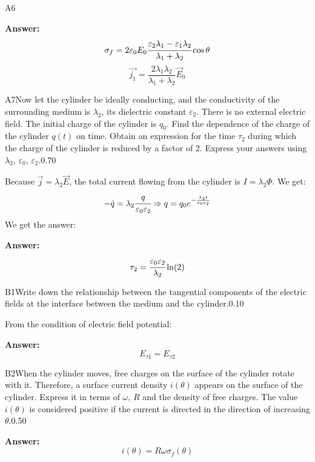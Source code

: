 \documentclass[11pt,a4paper]{article}
\begin{document}
\begin{solcard}{A6}
\par\smallskip\noindent\textbf{Answer:} \[\sigma_f = 2\varepsilon_0E_0\cfrac{\varepsilon_2\lambda_1 - \varepsilon_1\lambda_2}{\lambda_1 + \lambda_2}\cos\theta\]\[\vec{j_1} = \frac{2\lambda_1\lambda_2}{\lambda_1 + \lambda_2} \vec{E}_0\]
\end{solcard}

\begin{solcard}{A7}{Now let the cylinder be ideally conducting, and the conductivity of the surrounding medium is $\lambda_2$, its dielectric constant $\varepsilon_2$. There is no external electric field. The initial charge of the cylinder is $q_0$. Find the dependence of the charge of the cylinder $q(t)$ on time. Obtain an expression for the time $\tau_2$ during which the charge of the cylinder is reduced by a factor of 2. Express your answers using $\lambda_2$, $\varepsilon_0$, $\varepsilon_2$.}{0.70}

Because $\vec{j} = \lambda_2\vec{E}$, the total current flowing from the cylinder is $I = \lambda_2\Phi$. We get: \[-\dot{q} = \lambda_2\cfrac{q}{\varepsilon_0\varepsilon_2} \Rightarrow q = q_0e^{-\frac{\lambda_2t}{\varepsilon_0\varepsilon_2}}\]We get the answer:

\par\smallskip\noindent\textbf{Answer:} $$\tau_2 = \cfrac{\varepsilon_0\varepsilon_2}{\lambda_2}\ln(2)$$
\end{solcard}

\begin{solcard}{B1}{Write down the relationship between the tangential components of the electric fields at the interface between the medium and the cylinder.}{0.10}

From the condition of electric field potential:

\par\smallskip\noindent\textbf{Answer:} \[E_{\tau1} = E_{\tau2}\]
\end{solcard}

\begin{solcard}{B2}{When the cylinder moves, free charges on the surface of the cylinder rotate with it. Therefore, a surface current density $i (\theta)$ appears on the surface of the cylinder. Express it in terms of $\omega$, $R$ and the density of free charges.  The value $i(\theta)$ is considered positive if the current is directed in the direction of increasing $\theta$.}{0.50}
\par\smallskip\noindent\textbf{Answer:} \[i(\theta) = R\omega\sigma_f(\theta)\]
\end{solcard}
\end{document}

